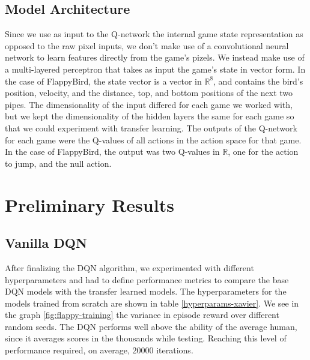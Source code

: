 \documentclass{article}
\begin{document}
\subsection{Model Architecture}
Since we use as input to the Q-network the internal game state representation as opposed to the raw pixel inputs, we don't make use of a convolutional neural network to learn features directly from the game's pizels.
We instead make use of a multi-layered perceptron that takes as input the game's state in vector form.
In the case of FlappyBird, the state vector is a vector in $\mathbb{R}^8$, and contains the bird's position, velocity, and the distance, top, and bottom positions of the next two pipes.
The dimensionality of the input differed for each game we worked with, but we kept the dimensionality of the hidden layers the same for each game so that we could experiment with transfer learning.
The outputs of the Q-network for each game were the Q-values of all actions in the action space for that game.
In the case of FlappyBird, the output was two Q-values in $\mathbb{R}$, one for the action to jump, and the null action.

\section{Preliminary Results}

\subsection{Vanilla DQN}
After finalizing the DQN algorithm, we experimented with different hyperparameters and had to define performance metrics to compare the base DQN models with the transfer learned models. 
The hyperparameters for the models trained from scratch are shown in table \ref{hyperparams-xavier}.
We see in the graph \ref{fig:flappy-training} the variance in episode reward over different random seeds.
The DQN performs well above the ability of the average human, since it averages scores in the thousands while testing.
Reaching this level of performance required, on average, $20000$ iterations.
\end{document}
